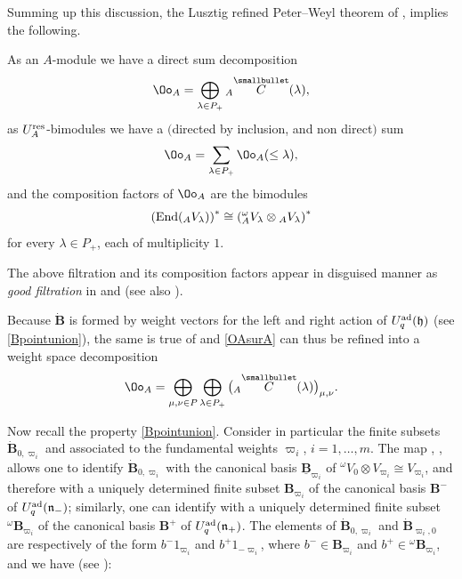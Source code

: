 Summing up this discussion, the Lusztig refined Peter--Weyl theorem of \cite[Section~29.3]{Lusztig}, implies the following.

\begin{teo} As an $A$-module we have a direct sum decomposition
\begin{equation}\label{OAsurA} \Oo_A = \bigoplus_{\lambda\in P_+} {}_A \overset{\raisebox{-1.5pt}{\scriptsize$\smallbullet$}}{C} (\lambda),
\end{equation}
as $U_A^{\rm res}$-bimodules we have a $($directed by inclusion, and non direct$)$ sum
\begin{equation}\label{OAbimod}
\Oo_A = \sum_{\lambda\in P_+} \Oo_A(\leq \lambda),
\end{equation}
and the composition factors of $\Oo_A$ are the bimodules
\begin{equation}\label{OAfacteurs}
\left({\rm End}({}_A V_\lambda)\right)^* \cong \left({}_A^{\omega} V_\lambda \otimes {}_A V_\lambda \right)^*
\end{equation}
for every $\lambda\in P_+$, each of multiplicity $1$. \end{teo}
\begin{Remark}{\rm The above filtration and its composition factors appear in disguised manner as {\it good filtration} in \cite{APW} and \cite{Paradowski} (see also \cite{VV}).}
\end{Remark}
Because $\dot{\mathbf{B}}$ is formed by weight vectors for the left and right action of $U_q^{\rm ad}(\mathfrak{h})$ (see \eqref{Bpointunion}), the same is true of  and \eqref{OAsurA} can thus be refined into a weight space decomposition
\begin{equation}\label{OAweightdecomp} \Oo_A = \bigoplus_{\mu,\nu\in P}\bigoplus_{\lambda\in P_+} \big({}_A \overset{\raisebox{-1.5pt}{\scriptsize$\smallbullet$}}{C} (\lambda)\big)_{\mu,\nu}.
\end{equation}

Now recall the property \eqref{Bpointunion}. Consider in particular the finite subsets $\dot{\mathbf{B}}_{0,\varpi_i}$ and  associated to the fundamental weights $\varpi_i$, $i=1,\dots, m$. The map , , allows one to identify $\dot{\mathbf{B}}_{0,\varpi_i}$ with the canonical basis $\underline{\mathbf{B}}_{\varpi_i}$ of ${}^\omega V_{0}\otimes V_{\varpi_i} \cong V_{\varpi_i}$, and therefore with a uniquely determined finite subset $\mathbf{B}_{\varpi_i}$ of the canonical basis $\mathbf{B}^-$ of $U_q^{\rm ad}(\mathfrak{n}_-)$; similarly, one can identify  with a uniquely determined finite subset ${}^\omega \mathbf{B}_{\varpi_i}$ of the canonical basis $\mathbf{B}^+$ of $U_q^{\rm ad}(\mathfrak{n}_+)$. The elements of $\dot{\mathbf{B}}_{0,\varpi_i}$ and $\dot{\mathbf{B}}_{\varpi_i,0}$ are respectively of the form $b^-1_{\varpi_i}$ and $b^+1_{-\varpi_i}$, where $b^- \in \mathbf{B}_{\varpi_i}$ and $b^+\in {}^\omega \mathbf{B}_{\varpi_i}$, and we have (see \cite[Proposition~3.3 and Section~3.4]{Lusztig3}):

